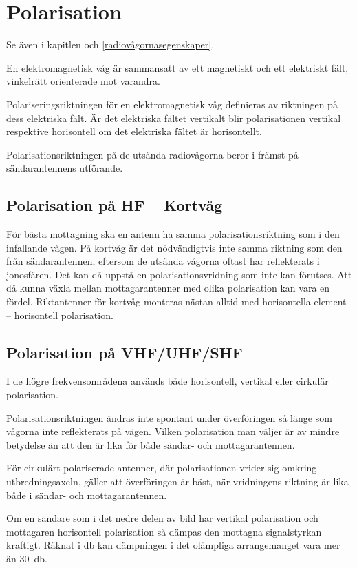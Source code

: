 \section{Polarisation}

Se även i kapitlen  och \ref{radiovågornasegenskaper}.

En elektromagnetisk våg är sammansatt av ett magnetiskt och ett
elektriskt fält, vinkelrätt orienterade mot varandra.

Polariseringsriktningen för en elektromagnetisk våg definieras av riktningen på
dess elektriska fält.
Är det elektriska fältet vertikalt blir polarisationen vertikal respektive
horisontell om det elektriska fältet är horisontellt.

Polarisationsriktningen på de utsända radiovågorna beror i främst på
sändarantennens utförande.

\subsection{Polarisation på HF -- Kortvåg}
\label{polarisation_hf}

För bästa mottagning ska en antenn ha samma polarisationsriktning som i den
infallande vågen.
På kortvåg är det nödvändigtvis inte samma riktning som den från
sändarantennen, eftersom de utsända vågorna oftast har reflekterats i
jonosfären.
Det kan då uppstå en polarisationsvridning som inte kan förutses.
Att då kunna växla mellan mottagarantenner med olika polarisation kan vara en
fördel.
Riktantenner för kortvåg monteras nästan alltid med horisontella element --
horisontell polarisation.

\subsection{Polarisation på VHF/UHF/SHF}
\label{polarisation_vhf}


I de högre frekvensområdena används både horisontell, vertikal eller
cirkulär polarisation.

Polarisationsriktningen ändras inte spontant under överföringen så
länge som vågorna inte reflekterats på vägen.
Vilken polarisation man väljer är av mindre betydelse än att den är lika
för både sändar- och mottagarantennen.

För cirkulärt polariserade antenner, där polarisationen vrider sig
omkring utbredningsaxeln, gäller att överföringen är bäst, när
vridningens riktning är lika både i sändar- och mottagarantennen.

Om en sändare som i det nedre delen av bild  har vertikal
polarisation och mottagaren horisontell polarisation så dämpas den mottagna
signalstyrkan kraftigt.
Räknat i \unit{\decibel} kan dämpningen i det olämpliga arrangemanget vara mer än
\qty{30}{\decibel}.
